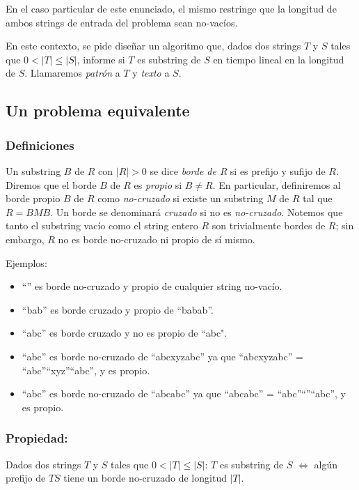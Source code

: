 En el caso particular de este enunciado, el mismo restringe que la longitud de ambos strings de entrada del problema sean no-vacíos.

En este contexto, se pide diseñar un algoritmo que, dados dos strings $T$ y $S$ tales que $0 < |T| \leq |S|$, informe si $T$ es substring de $S$ en tiempo lineal en la longitud de $S$. Llamaremos \textit{patrón} a $T$ y \textit{texto} a $S$.

\subsection{Un problema equivalente}

\subsubsection{Definiciones}

Un substring $B$ de $R$ con $|R| > 0$ se dice \textit{borde de R} si es prefijo y sufijo de $R$. Diremos que el borde $B$ de $R$ es \textit{propio} si $B \neq R$. En particular, definiremos al borde propio $B$ de $R$ como \textit{no-cruzado} si existe un substring $M$ de $R$ tal que $R = BMB$. Un borde se denominará \textit{cruzado} si no es \textit{no-cruzado}. Notemos que tanto el substring vacío como el string entero $R$ son trivialmente bordes de $R$; sin embargo, $R$ no es borde no-cruzado ni propio de sí mismo.

Ejemplos:
\begin{itemize}
\setlength\itemsep{0em}
\item ``'' es borde no-cruzado y propio de cualquier string no-vacío.
\item ``bab'' es borde cruzado y propio de ``babab''.
\item ``abc'' es borde cruzado y no es propio de ``abc".
\item ``abc'' es borde no-cruzado de ``abcxyzabc'' ya que ``abcxyzabc'' = ``abc''``xyz''``abc'', y es propio.
\item ``abc'' es borde no-cruzado de ``abcabc'' ya que ``abcabc'' = ``abc''``''``abc'', y es propio.
\end{itemize}

\subsubsection{Propiedad:} Dados dos strings $T$ y $S$ tales que $0 < |T| \leq |S|$:
$T$ es substring de $S$ $\iff$ algún prefijo de $TS$ tiene un borde no-cruzado de longitud $|T|$.

